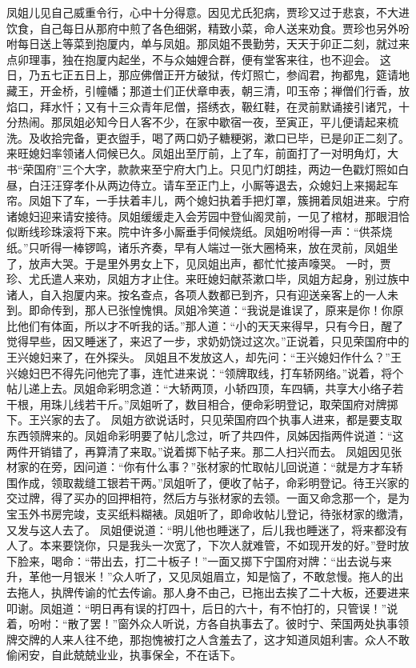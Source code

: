 \documentclass[12pt,oneside]{book}
\begin{document}
凤姐儿见自己威重令行，心中十分得意。因见尤氏犯病，贾珍又过于悲哀，不大进饮食，自己每日从那府中煎了各色细粥，精致小菜，命人送来劝食。贾珍也另外吩咐每日送上等菜到抱厦内，单与凤姐。那凤姐不畏勤劳，天天于卯正二刻，就过来点卯理事，独在抱厦内起坐，不与众妯娌合群，便有堂客来往，也不迎会。
这日，乃五七正五日上，那应佛僧正开方破狱，传灯照亡，参阎君，拘都鬼，筵请地藏王，开金桥，引幢幡；那道士们正伏章申表，朝三清，叩玉帝；禅僧们行香，放焰口，拜水忏；又有十三众青年尼僧，搭绣衣，靸红鞋，在灵前默诵接引诸咒，十分热闹。那凤姐必知今日人客不少，在家中歇宿一夜，至寅正，平儿便请起来梳洗。及收拾完备，更衣盥手，喝了两口奶子糖粳粥，漱口已毕，已是卯正二刻了。来旺媳妇率领诸人伺候已久。凤姐出至厅前，上了车，前面打了一对明角灯，大书“荣国府”三个大字，款款来至宁府大门上。只见门灯朗挂，两边一色戳灯照如白昼，白汪汪穿孝仆从两边侍立。请车至正门上，小厮等退去，众媳妇上来揭起车帘。凤姐下了车，一手扶着丰儿，两个媳妇执着手把灯罩，簇拥着凤姐进来。宁府诸媳妇迎来请安接待。凤姐缓缓走入会芳园中登仙阁灵前，一见了棺材，那眼泪恰似断线珍珠滚将下来。院中许多小厮垂手伺候烧纸。凤姐吩咐得一声：“供茶烧纸。”只听得一棒锣鸣，诸乐齐奏，早有人端过一张大圈椅来，放在灵前，凤姐坐了，放声大哭。于是里外男女上下，见凤姐出声，都忙忙接声嚎哭。
一时，贾珍、尤氏遣人来劝，凤姐方才止住。来旺媳妇献茶漱口毕，凤姐方起身，别过族中诸人，自入抱厦内来。按名查点，各项人数都已到齐，只有迎送亲客上的一人未到。即命传到，那人已张惶愧惧。凤姐冷笑道：“我说是谁误了，原来是你！你原比他们有体面，所以才不听我的话。”那人道：“小的天天来得早，只有今日，醒了觉得早些，因又睡迷了，来迟了一步，求奶奶饶过这次。”正说着，只见荣国府中的王兴媳妇来了，在外探头。
凤姐且不发放这人，却先问：“王兴媳妇作什么？”王兴媳妇巴不得先问他完了事，连忙进来说：“领牌取线，打车轿网络。”说着，将个帖儿递上去。凤姐命彩明念道：“大轿两顶，小轿四顶，车四辆，共享大小络子若干根，用珠儿线若干斤。”凤姐听了，数目相合，便命彩明登记，取荣国府对牌掷下。王兴家的去了。
凤姐方欲说话时，只见荣国府四个执事人进来，都是要支取东西领牌来的。凤姐命彩明要了帖儿念过，听了共四件，凤姊因指两件说道：“这两件开销错了，再算清了来取。”说着掷下帖子来。那二人扫兴而去。
凤姐因见张材家的在旁，因问道：“你有什么事？”张材家的忙取帖儿回说道：“就是方才车轿围作成，领取裁缝工银若干两。”凤姐听了，便收了帖子，命彩明登记。待王兴家的交过牌，得了买办的回押相符，然后方与张材家的去领。一面又命念那一个，是为宝玉外书房完竣，支买纸料糊裱。凤姐听了，即命收帖儿登记，待张材家的缴清，又发与这人去了。
凤姐便说道：“明儿他也睡迷了，后儿我也睡迷了，将来都没有人了。本来要饶你，只是我头一次宽了，下次人就难管，不如现开发的好。”登时放下脸来，喝命：“带出去，打二十板子！”一面又掷下宁国府对牌：“出去说与来升，革他一月银米！”众人听了，又见凤姐眉立，知是恼了，不敢怠慢。拖人的出去拖人，执牌传谕的忙去传谕。那人身不由己，已拖出去挨了二十大板，还要进来叩谢。凤姐道：“明日再有误的打四十，后日的六十，有不怕打的，只管误！”说着，吩咐：“散了罢！”窗外众人听说，方各自执事去了。彼时宁、荣国两处执事领牌交牌的人来人往不绝，那抱愧被打之人含羞去了，这才知道凤姐利害。众人不敢偷闲安，自此兢兢业业，执事保全，不在话下。
\end{document}
